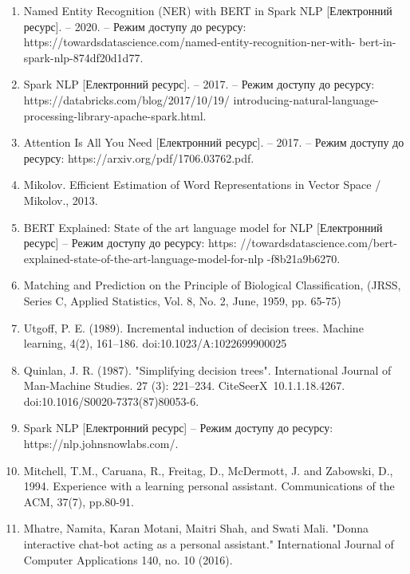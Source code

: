\begin{enumerate}
\item Named Entity Recognition (NER) with BERT in Spark NLP [Електронний ресурс]. – 2020. – Режим доступу до ресурсу: https://towardsdatascience.com/named-entity-recognition-ner-with-  bert-in-spark-nlp-874df20d1d77.
\item Spark NLP [Електронний ресурс]. – 2017. – Режим доступу до ресурсу: https://databricks.com/blog/2017/10/19/ introducing-natural-language-processing-library-apache-spark.html.
\item Attention Is All You Need [Електронний ресурс]. – 2017. – Режим доступу до ресурсу: https://arxiv.org/pdf/1706.03762.pdf.
\item Mikolov. Efficient Estimation of Word Representations in Vector Space / Mikolov., 2013.
\item BERT Explained: State of the art language model for NLP [Електронний ресурс] – Режим доступу до ресурсу: https: //towardsdatascience.com/bert-explained-state-of-the-art-language-model-for-nlp -f8b21a9b6270.
\item Matching and Prediction on the Principle of Biological Classification, (JRSS, Series C, Applied Statistics, Vol. 8, No. 2, June, 1959, pp. 65-75)
\item Utgoff, P. E. (1989). Incremental induction of decision trees. Machine learning, 4(2), 161–186. doi:10.1023/A:1022699900025
\item Quinlan, J. R. (1987). "Simplifying decision trees". International Journal of Man-Machine Studies. 27 (3): 221–234. CiteSeerX 10.1.1.18.4267. doi:10.1016/S0020-7373(87)80053-6.
\item Spark NLP [Електронний ресурс] – Режим доступу до ресурсу: https://nlp.johnsnowlabs.com/.
\item Mitchell, T.M., Caruana, R., Freitag, D., McDermott, J. and Zabowski, D., 1994. Experience with a learning personal assistant. Communications of the ACM, 37(7), pp.80-91.
\item Mhatre, Namita, Karan Motani, Maitri Shah, and Swati Mali. "Donna interactive chat-bot acting as a personal assistant." International Journal of Computer Applications 140, no. 10 (2016).


\end{enumerate}
 